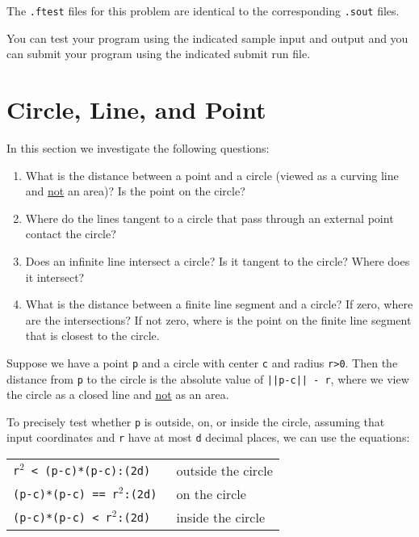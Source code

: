 \documentclass[12pt]{article}
\begin{document}
The {\tt .ftest} files for this problem are identical
to the corresponding {\tt .sout} files.

You can test your program using the indicated sample input and
output and you can submit your program using the indicated submit
run file.

\newpage


\section{Circle, Line, and Point}
In this section we investigate the following questions:
\begin{enumerate}
\item What is the distance between a point and a circle (viewed as
a curving line and \underline{not} an area)?
Is the point on the circle?
\item Where do the lines tangent to a circle that pass through
an external point contact the
circle?
\item Does an infinite line intersect a circle?  Is it
tangent to the circle?  Where does it intersect?
\item What is the distance between a finite line segment and
a circle?  If zero, where are the intersections?  If not zero,
where is the point on the finite line segment that is closest to the
circle.
\end{enumerate}

Suppose we have a point {\tt p} and a circle with center {\tt c}
and radius {\tt r>0}.  Then the distance from {\tt p} to the circle
is the absolute value of {\tt ||p-c|| - r},
where we view the circle as a closed line
and \underline{not} as an area.

To precisely test whether {\tt p} is outside, on, or inside the
circle, assuming that input coordinates and {\tt r} have at most
{\tt d} decimal places, we can use the equations:
\begin{center}
\begin{tabular}{l@{~~~~~}l}
\tt r$^2$ < (p-c)*(p-c):(2d) & outside the circle \\
\tt (p-c)*(p-c) == r$^2$:(2d) & on the circle \\
\tt (p-c)*(p-c) < r$^2$:(2d) & inside the circle \\
\end{tabular}
\end{center}
\end{document}
